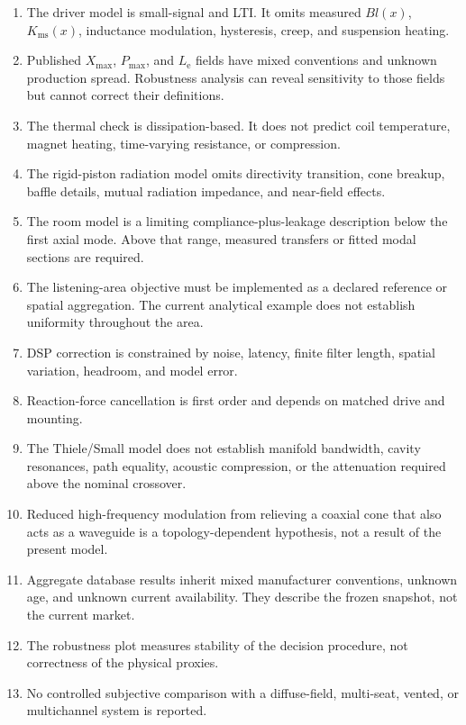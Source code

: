 \documentclass[11pt,a4paper]{article}
\numberwithin{equation}{section}
\newcommand{\Xmax}{X_{\mathrm{max}}}
\newcommand{\Le}{L_{\mathrm{e}}}
\newcommand{\Pmax}{P_{\mathrm{max}}}
\begin{document}
\begin{enumerate}
	\item The driver model is small-signal and LTI.  It omits measured
	$Bl(x)$, $K_{\mathrm{ms}}(x)$, inductance modulation, hysteresis, creep,
	and suspension heating.
	\item Published $\Xmax$, $\Pmax$, and $\Le$ fields have mixed conventions
	and unknown production spread.  Robustness analysis can reveal
	sensitivity to those fields but cannot correct their definitions.
	\item The thermal check is dissipation-based.  It does not predict coil
	temperature, magnet heating, time-varying resistance, or compression.
	\item The rigid-piston radiation model omits directivity transition,
	cone breakup, baffle details, mutual radiation impedance, and near-field
	effects.
	\item The room model is a limiting compliance-plus-leakage description
	below the first axial mode.  Above that range, measured transfers or
	fitted modal sections are required.
	\item The listening-area objective must be implemented as a declared
	reference or spatial aggregation.  The current analytical example does
	not establish uniformity throughout the area.
	\item DSP correction is constrained by noise, latency, finite filter
	length, spatial variation, headroom, and model error.
	\item Reaction-force cancellation is first order and depends on matched
	drive and mounting.
	\item The Thiele/Small model does not establish manifold bandwidth,
	cavity resonances, path equality, acoustic compression, or the
	attenuation required above the nominal crossover.
	\item Reduced high-frequency modulation from relieving a coaxial cone
	that also acts as a waveguide is a topology-dependent hypothesis, not a
	result of the present model.
	\item Aggregate database results inherit mixed manufacturer conventions,
	unknown age, and unknown current availability.  They describe the frozen
	snapshot, not the current market.
	\item The robustness plot measures stability of the decision procedure,
	not correctness of the physical proxies.
	\item No controlled subjective comparison with a diffuse-field,
	multi-seat, vented, or multichannel system is reported.
\end{enumerate}
\end{document}
